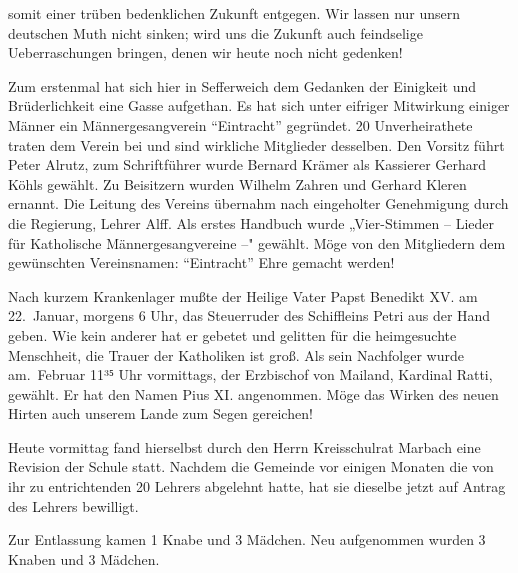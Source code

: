 

somit einer trüben bedenklichen Zukunft entgegen.\ob
Wir lassen nur unsern deutschen Muth nicht sinken;\ob
wird uns die Zukunft auch feindselige Ueberraschungen\ob
bringen, denen wir heute noch nicht gedenken!

%
Zum erstenmal hat sich hier in Sefferweich dem\ob
Gedanken der Einigkeit und Brüderlichkeit eine\ob
Gasse aufgethan. Es hat sich unter eifriger Mitwirkung\ob
einiger Männer ein Männergesangverein \enquote{Eintracht}\ob
gegründet. 20 Unverheirathete traten dem Verein bei\ob
und sind wirkliche Mitglieder desselben. Den Vorsitz\ob
führt Peter Alrutz, zum Schriftführer wurde Bernard\ob
Krämer als Kassierer Gerhard Köhls gewählt. Zu\ob
Beisitzern wurden Wilhelm Zahren und Gerhard Kleren\ob
ernannt. Die Leitung des Vereins übernahm nach\ob
eingeholter Genehmigung durch die Regierung, Lehrer\ob
Alff. Als erstes Handbuch wurde „Vier-Stimmen – Lieder für Katholische Männergesangvereine –"\ob
gewählt. Möge von den Mitgliedern dem gewünschten\ob
Vereinsnamen: \enquote{Eintracht} Ehre gemacht werden!

%
Nach kurzem Krankenlager mußte der Heilige Vater\ob
Papst Benedikt XV. am 22.\ Januar, morgens 6 Uhr,\ob
das Steuerruder des Schiffleins Petri aus der Hand\ob
geben. Wie kein anderer hat er gebetet und gelitten\ob
für die heimgesuchte Menschheit, die Trauer der\ob
Katholiken ist groß. Als sein Nachfolger wurde am.\ Februar 11³⁵ Uhr vormittags, der Erzbischof von\ob
Mailand, Kardinal Ratti, gewählt. Er hat den Namen\ob
Pius XI. angenommen. Möge das Wirken des neuen\ob
Hirten auch unserem Lande zum Segen gereichen!

\pend
{}
\pstart

%
Heute vormittag fand hierselbst durch den Herrn\ob
Kreisschulrat Marbach eine Revision der Schule statt.\ob
Nachdem die Gemeinde vor einigen Monaten die von\ob
ihr zu entrichtenden 20%
Lehrers abgelehnt hatte, hat sie dieselbe jetzt auf\ob
Antrag des Lehrers bewilligt.

%
Zur Entlassung kamen 1 Knabe und 3 Mädchen.\ob
Neu aufgenommen wurden 3 Knaben und 3 Mädchen.
\pend
